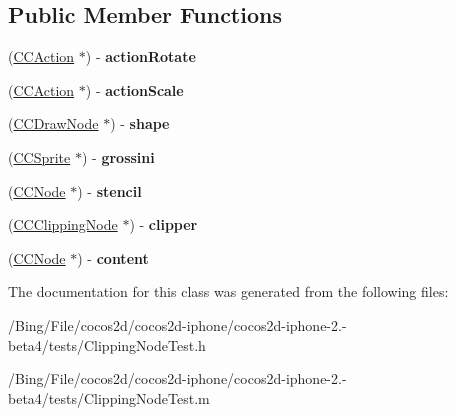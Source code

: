 \subsection*{Public Member Functions}
\begin{DoxyCompactItemize}
\item 
\hypertarget{interface_basic_test_a45e98602db1ceca6922ef92cbf856502}{(\hyperlink{interface_c_c_action}{C\-C\-Action} $\ast$) -\/ {\bfseries action\-Rotate}}\label{interface_basic_test_a45e98602db1ceca6922ef92cbf856502}

\item 
\hypertarget{interface_basic_test_a4aafd47fee14a858344b4ead338db130}{(\hyperlink{interface_c_c_action}{C\-C\-Action} $\ast$) -\/ {\bfseries action\-Scale}}\label{interface_basic_test_a4aafd47fee14a858344b4ead338db130}

\item 
\hypertarget{interface_basic_test_a41d66ea4065f49475d7677eb19f386a2}{(\hyperlink{interface_c_c_draw_node}{C\-C\-Draw\-Node} $\ast$) -\/ {\bfseries shape}}\label{interface_basic_test_a41d66ea4065f49475d7677eb19f386a2}

\item 
\hypertarget{interface_basic_test_accac89de84869800887243599f0f8ec3}{(\hyperlink{class_c_c_sprite}{C\-C\-Sprite} $\ast$) -\/ {\bfseries grossini}}\label{interface_basic_test_accac89de84869800887243599f0f8ec3}

\item 
\hypertarget{interface_basic_test_ac227444cd5fe81d4dc48d77982d9de5b}{(\hyperlink{class_c_c_node}{C\-C\-Node} $\ast$) -\/ {\bfseries stencil}}\label{interface_basic_test_ac227444cd5fe81d4dc48d77982d9de5b}

\item 
\hypertarget{interface_basic_test_a98458bca4c3432829a600dfbdf2d7031}{(\hyperlink{interface_c_c_clipping_node}{C\-C\-Clipping\-Node} $\ast$) -\/ {\bfseries clipper}}\label{interface_basic_test_a98458bca4c3432829a600dfbdf2d7031}

\item 
\hypertarget{interface_basic_test_a541af8c9203889d4f365ce7538d97d09}{(\hyperlink{class_c_c_node}{C\-C\-Node} $\ast$) -\/ {\bfseries content}}\label{interface_basic_test_a541af8c9203889d4f365ce7538d97d09}

\end{DoxyCompactItemize}


The documentation for this class was generated from the following files\-:\begin{DoxyCompactItemize}
\item 
/\-Bing/\-File/cocos2d/cocos2d-\/iphone/cocos2d-\/iphone-\/2.-\/beta4/tests/Clipping\-Node\-Test.\-h\item 
/\-Bing/\-File/cocos2d/cocos2d-\/iphone/cocos2d-\/iphone-\/2.-\/beta4/tests/Clipping\-Node\-Test.\-m\end{DoxyCompactItemize}
